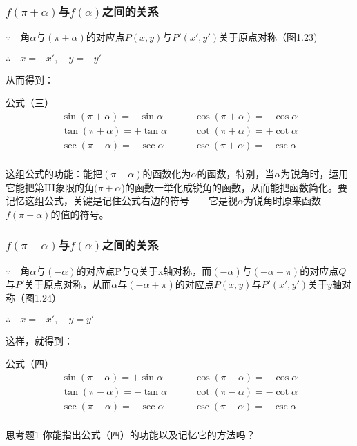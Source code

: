 \subsubsection{$f(\pi+\alpha)$与$f(\alpha)$之间的关系}
$\because\quad $角$\alpha$与$(\pi+\alpha)$的对应点$P(x,y)$与$P'(x',y')$关于原点对称（图1.23)

$\therefore\quad x=-x',\quad y=-y'$

从而得到：

\begin{thm}{公式（三）}
\[\begin{split}
\sin(\pi+\alpha)=-\sin\alpha   &\qquad  \cos(\pi+\alpha)=-\cos\alpha \\
\tan(\pi+\alpha)=+\tan\alpha  &\qquad \cot(\pi+\alpha)=+\cot\alpha \\
\sec(\pi+\alpha)=-\sec\alpha  &\qquad \csc(\pi+\alpha)=-\csc\alpha \\
\end{split}\]
\end{thm}

这组公式的功能：能把$(\pi+\alpha)$的函数化为$\alpha$的函数，特别，当$\alpha$为锐角时，运用它能把第III象限的角$(\pi+\alpha$)的函数一举化成锐角的函数，从而能把函数简化。要记忆这组公式，关键是记住公式右边的符号——它是视$\alpha$为锐角时原来函数$f(\pi+\alpha)$的值的符号。

\subsubsection{$f(\pi-\alpha)$与$f(\alpha)$之间的关系}
$\because\quad $角$\alpha$与$(-\alpha)$的对应点P与Q关于x轴对称，而$(-\alpha)$与$(-\alpha+\pi)$的对应点$Q$与$P'$关于原点对称，从而$\alpha$与$(-\alpha+\pi)$的对应点$P(x,y)$与$P'(x',y')$关于$y$轴对称（图1.24）

$\therefore\quad 
x=-x',\quad y=y'$

这样，就得到：

\begin{thm}{公式（四）}
    \[\begin{split}
\sin(\pi-\alpha)=+\sin\alpha   &\qquad  \cos(\pi-\alpha)=-\cos\alpha \\
\tan(\pi-\alpha)=-\tan\alpha  &\qquad \cot(\pi-\alpha)=-\cot\alpha \\
\sec(\pi-\alpha)=-\sec\alpha  &\qquad \csc(\pi-\alpha)=+\csc\alpha \\
\end{split}\]
\end{thm}

\begin{thm}{思考题1}
    你能指出公式（四）的功能以及记忆它的方法吗？
\end{thm}

